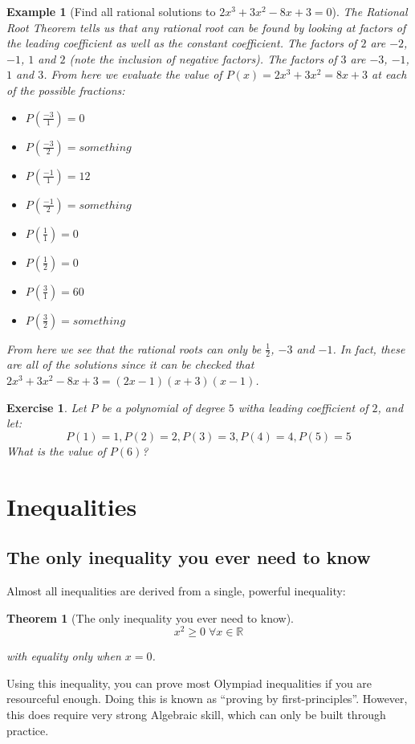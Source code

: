 \documentclass[a4paper,12pt]{article}
\newtheorem{example}{Example}[section]
\newtheorem{exercise}{Exercise}[section]
\newtheorem{theorem}{Theorem}[section]
\begin{document}
\begin{example}[Find all rational solutions to $2x^3 + 3x^2 - 8x + 3 = 0$]
    The Rational Root Theorem tells us that any rational root can be found by looking at factors of the leading coefficient as well as the constant coefficient.
    The factors of $2$ are $-2$, $-1$, $1$ and $2$ (note the inclusion of negative factors). The factors of $3$ are $-3$, $-1$, $1$ and $3$. From here we evaluate the value of $P(x) = 2x^3 + 3x^2 = 8x + 3$ at each of the possible fractions:
    \begin{itemize}
        \item $P(\frac{-3}{1}) = 0$
        \item $P(\frac{-3}{2}) = something$
        \item $P(\frac{-1}{1}) = 12$
        \item $P(\frac{-1}{2}) = something$
        \item $P(\frac{1}{1}) = 0$
        \item $P(\frac{1}{2}) = 0$ 
        \item $P(\frac{3}{1}) = 60$
        \item $P(\frac{3}{2}) = something$
    \end{itemize}
    From here we see that the rational roots can only be $\frac{1}{2}$, $-3$ and $-1$. In fact, these are all of the solutions since it can be checked that $2x^3 + 3x^2 - 8x + 3 = (2x - 1)(x + 3)(x - 1)$.
\end{example}

\begin{exercise}
    Let $P$ be a polynomial of degree $5$ witha  leading coefficient of $2$, and let:
    $$P(1) = 1, P(2) = 2, P(3) = 3, P(4) = 4, P(5) = 5$$
    What is the value of $P(6)$?
\end{exercise}

\clearpage

\section{Inequalities}

\subsection{The only inequality you ever need to know}
Almost all inequalities are derived from a single, powerful inequality:
\begin{theorem}[The only inequality you ever need to know]
$$x^2 \geq 0\; \forall x \in \mathbb{R}$$

with equality only when $x = 0$.
\end{theorem}
Using this inequality, you can prove most Olympiad inequalities if you are resourceful enough.
Doing this is known as ``proving by first-principles''. However, this does require very strong Algebraic skill, which can only be built through practice.\\
\end{document}
